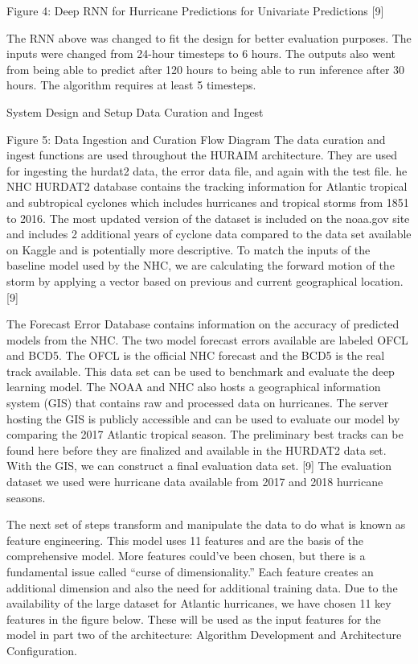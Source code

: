 \documentclass{article}
\begin{document}
Figure 4: Deep RNN for Hurricane Predictions for Univariate Predictions [9]

The RNN above was changed to fit the design for better evaluation purposes. The inputs were changed from 24-hour timesteps to 6 hours. The outputs also went from being able to predict after 120 hours to being able to run inference after 30 hours. The algorithm requires at least 5 timesteps. 

System Design and Setup
Data Curation and Ingest


Figure 5: Data Ingestion and Curation Flow Diagram
The data curation and ingest functions are used throughout the HURAIM architecture. They are used for ingesting the hurdat2 data, the error data file, and again with the test file. he NHC HURDAT2 database contains the tracking information for Atlantic tropical and subtropical cyclones which includes hurricanes and tropical storms from 1851 to 2016. The most updated version of the dataset is included on the noaa.gov site and includes 2 additional years of cyclone data compared to the data set available on Kaggle and is potentially more descriptive. To match the inputs of the baseline model used by the NHC, we are calculating the forward motion of the storm by applying a vector based on previous and current geographical location.  [9]

The Forecast Error Database contains information on the accuracy of predicted models from the NHC. The two model forecast errors available are labeled OFCL and BCD5. The OFCL is the official NHC forecast and the BCD5 is the real track available. This data set can be used to benchmark and evaluate the deep learning model. The NOAA and NHC also hosts a geographical information system (GIS) that contains raw and processed data on hurricanes. The server hosting the GIS is publicly accessible and can be used to evaluate our model by comparing the 2017 Atlantic tropical season. The preliminary best tracks can be found here before they are finalized and available in the HURDAT2 data set. With the GIS, we can construct a final evaluation data set. [9] The evaluation dataset we used were hurricane data available from 2017 and 2018 hurricane seasons. 

The next set of steps transform and manipulate the data to do what is known as feature engineering. This model uses 11 features and are the basis of the comprehensive model. More features could’ve been chosen, but there is a fundamental issue called “curse of dimensionality.” Each feature creates an additional dimension and also the need for additional training data. Due to the availability of the large dataset for Atlantic hurricanes, we have chosen 11 key features in the figure below. These will be used as the input features for the model in part two of the architecture: Algorithm Development and Architecture Configuration.
\end{document}
